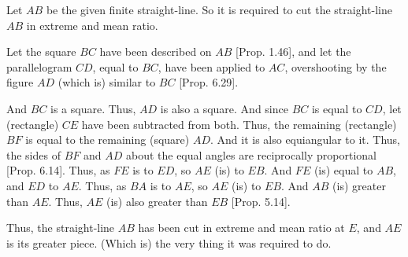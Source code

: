 \begin{Parallel}{}{}
{\epsfysize=2.2in
\centerline{}

Let $AB$ be the given finite straight-line. So it is required to cut the straight-line $AB$ in extreme and mean ratio.

Let the square $BC$ have been described on $AB$  [Prop. 1.46],
and let the parallelogram $CD$, equal to $BC$, have been applied to $AC$,
overshooting by the figure $AD$ (which is) similar to $BC$ [Prop. 6.29].

And $BC$ is a square. Thus, $AD$ is also a square. And since $BC$ is equal to
$CD$, let (rectangle) $CE$ have been subtracted from both. Thus, the remaining (rectangle) $BF$
is equal to the remaining (square) $AD$. And it is also equiangular to it. 
Thus, the sides of $BF$ and $AD$ about the equal angles are reciprocally proportional [Prop. 6.14]. 
Thus, as $FE$ is to $ED$, so $AE$ (is) to $EB$. And $FE$ (is) equal to $AB$, and $ED$ to
$AE$. Thus, as $BA$ is to $AE$, so $AE$ (is) to $EB$.  And $AB$ (is)
 greater than $AE$. Thus, $AE$ (is) also greater than $EB$ [Prop. 5.14].
 
 Thus, the straight-line $AB$ has been cut in extreme and mean ratio at $E$,
 and $AE$ is its greater piece. (Which is) the very thing it was required to
 do.}
\end{Parallel}


\vspace{7pt}{\footnotesize\noindent$^\dag$ This method of cutting a straight-line
is sometimes called the ``Golden Section''---see Prop.~2.11.}

